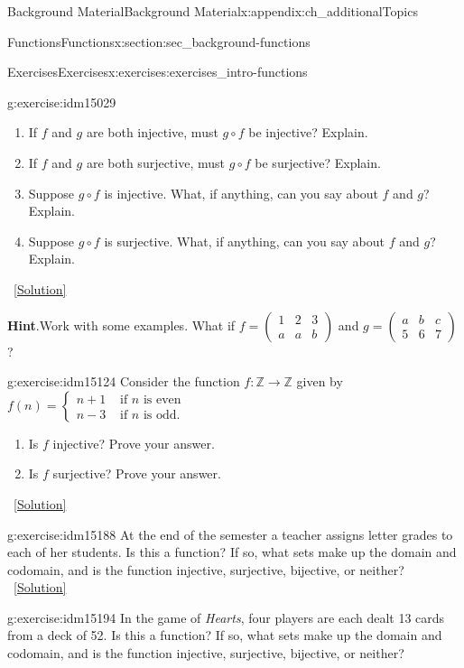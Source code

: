 \documentclass[oneside,10pt,]{book}
\numberwithin{equation}{chapter}
\def\Z{\mathbb Z}
\newcommand{\twoline}[2]{\begin{pmatrix}#1 \\ #2 \end{pmatrix}}
\newcommand{\amp}{&}
\begin{document}
\begin{appendixptx}{Background Material}{}{Background Material}{}{}{x:appendix:ch_additionalTopics}
\begin{sectionptx}{Functions}{}{Functions}{}{}{x:section:sec_background-functions}
\begin{exercises-subsection}{Exercises}{}{Exercises}{}{}{x:exercises:exercises_intro-functions}
\begin{divisionexercise}{13}{}{}{g:exercise:idm15029}
%
\begin{enumerate}[label=(\alph*)]
\item{}If \(f\) and \(g\) are both injective, must \(g\circ f\) be injective?  Explain.%
\item{}If \(f\) and \(g\) are both surjective, must \(g\circ f\) be surjective?  Explain.%
\item{}Suppose \(g\circ f\) is injective.  What, if anything, can you say about \(f\) and \(g\)?  Explain.%
\item{}Suppose \(g\circ f\) is surjective.  What, if anything, can you say about \(f\) and \(g\)?  Explain.%
\end{enumerate}
%
\qquad~\hfill{\tiny\hyperlink{g:solution:idm15071-main}{[Solution]}}\par\smallskip%
\noindent\textbf{Hint}.\hypertarget{g:hint:idm15067}{}\quad{}Work with some examples.  What if \(f = \twoline{1\amp 2 \amp 3}{a \amp a \amp b}\) and \(g = \twoline{a\amp b \amp c}{5 \amp 6 \amp 7}\)?%
\end{divisionexercise}%
\begin{divisionexercise}{14}{}{}{g:exercise:idm15124}%
Consider the function \(f:\Z \to \Z\) given by \(f(n) = \begin{cases}n+1 \amp  \text{ if }n\text{ is even} \\ n-3 \amp \text{ if }n\text{ is odd} . \end{cases}\)%
\begin{enumerate}[label=(\alph*)]
\item{}Is \(f\) injective? Prove your answer.%
\item{}Is \(f\) surjective? Prove your answer.%
\end{enumerate}
%
\qquad~\hfill{\tiny\hyperlink{g:solution:idm15136-main}{[Solution]}}\end{divisionexercise}%
\begin{divisionexercise}{15}{}{}{g:exercise:idm15188}%
At the end of the semester a teacher assigns letter grades to each of her students. Is this a function? If so, what sets make up the domain and codomain, and is the function injective, surjective, bijective, or neither?%
\qquad~\hfill{\tiny\hyperlink{g:solution:idm15191-main}{[Solution]}}\end{divisionexercise}%
\begin{divisionexercise}{16}{}{}{g:exercise:idm15194}%
In the game of \emph{Hearts}, four players are each dealt 13 cards from a deck of 52. Is this a function? If so, what sets make up the domain and codomain, and is the function injective, surjective, bijective, or neither?%

\end{divisionexercise}
\end{exercises-subsection}
\end{sectionptx}
\end{appendixptx}
\end{document}
